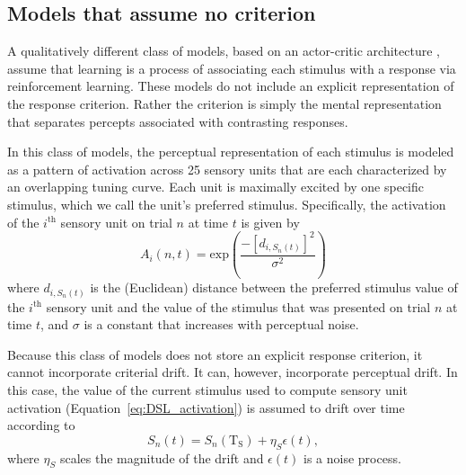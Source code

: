 \documentclass[doc, floatsintext]{apa7}
\begin{document}
\subsection{Models that assume no criterion}
A qualitatively different class of models, based on an
actor-critic architecture \parencite{SuttonBarto1998},
assume that learning is a process of associating each
stimulus with a response via reinforcement learning. These
models do not include an explicit representation of the
response criterion. Rather the criterion is simply the
mental representation that separates percepts associated
with contrasting responses. 

In this class of models, the perceptual representation of
each stimulus is modeled as a pattern of activation across
25 sensory units that are each characterized by an
overlapping tuning curve. Each unit is maximally excited by
one specific stimulus, which we call the unit's preferred
stimulus. Specifically, the activation of the $i^\text{th}$
sensory unit on trial $n$ at time $t$ is given by
\begin{equation}
  A_i(n,t) = \text{exp} \left( \frac{-\left[d_{i,S_n(t)}\right]^2}{\sigma^2} \right)
  \label{eq:DSL_activation}
\end{equation}
where $d_{i,S_n(t)}$ is the (Euclidean) distance between the
preferred stimulus value of the $i^\text{th}$ sensory unit
and the value of the stimulus that was presented on trial
$n$ at time $t$, and $\sigma$ is a constant that increases
with perceptual noise.

Because this class of models does not store an explicit
response criterion, it cannot incorporate criterial drift.
It can, however, incorporate perceptual drift. In this case,
the value of the current stimulus used to compute sensory
unit activation (Equation~\ref{eq:DSL_activation}) is
assumed to drift over time according to
\begin{equation}
  S_n(t) = S_n(\text{T}_\text{S}) + \eta_S \epsilon(t),
  \label{eq:stimulus_drift_RL}
\end{equation}
where $\eta_S$ scales the magnitude of the drift and
$\epsilon(t)$ is a noise process.
\end{document}
